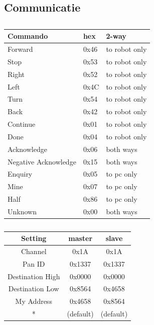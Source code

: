 \documentclass{report}
\begin{document}
\begin{appendices}
\chapter{Communicatie}
\label{app:communicatie}
\begin{table}[H]
\centering
\caption{}
\begin{subtable}{0.48\textwidth}
\label{tab:comProtocol}
\centering
\begin{tabular}{@{}lll@{}}
\toprule
\textbf{Commando} & \textbf{hex} & \textbf{2-way} \\
\midrule
Forward				& 0x46 	& to robot only\\
Stop 					& 0x53 	& to robot only\\
Right 					& 0x52 	& to robot only\\
Left 					& 0x4C 	& to robot only\\
Turn					& 0x54 	& to robot only\\
Back					& 0x42 	& to robot only\\
Continue				& 0x01	& to robot only\\
Done 					& 0x04	& to robot only\\
Acknowledge 			& 0x06	& both ways\\
Negative Acknowledge 		& 0x15	& both ways \\
Enquiry 				& 0x05	& to pc only\\
Mine 					& 0x07	& to pc only\\
Half					& 0x86 	& to pc only\\
Unknown 				& 0x00	& both ways\\
\bottomrule
\end{tabular}
\end{subtable}
\quad
\begin{subtable}{0.48\textwidth}
\label{tab:XBeeSettings}
\centering
\begin{tabular}{@{}ccc@{}}
\toprule
\textbf{Setting} & \textbf{master}& \textbf{slave} \\
\midrule
Channel				& 0x1A 	& 0x1A\\
Pan ID				& 0x1337 	& 0x1337\\
Destination High			& 0x0000	& 0x0000\\
Destination Low			& 0x8564 	& 0x4658\\
My Address				& 0x4658 	& 0x8564\\
*		 			& (default)	&(default)\\
\bottomrule
\end{tabular}
\end{subtable}
\end{table}


\end{appendices}
\end{document}
